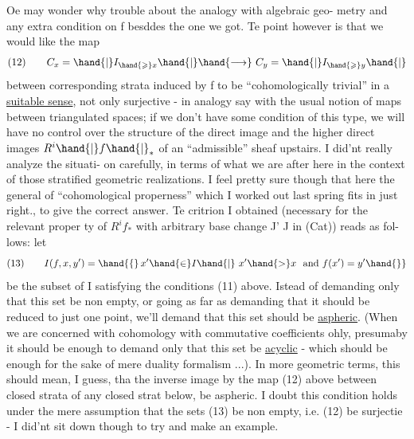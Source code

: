 Oe may wonder why trouble about the analogy with algebraic geo-%
metry and any extra condition on f besddes the one we got.  Te point
however is that we would like the map
\[ \text{(12)} \qquad C_x = \hand{|} I_{\hand{\geqslant}x} \hand{|} \hand{\longrightarrow} \ C_y = \hand{|} I_{\hand{\geqslant}y} \hand{|} \]
between corresponding strata induced by \hand{$|$}f\hand{$|$} to be ``cohomologically
trivial'' in a \uline{suitable sense},  not only surjective  -  in analogy say
with the usual notion of maps between triangulated spaces;  if we don't
have some condition of this type,  we will have no control over the
structure of the direct image and the higher direct images $R^i\hand{|}f\hand{|}_*$
of an ``admissible'' sheaf upstairs.  I did'nt really analyze the situati-%
on carefully,  in terms of what we are after here in the context of
those stratified geometric realizations.  I feel pretty sure though 
that here the general  of ``cohomological properness'' which I
worked out last spring fits in just right.,  to give the correct answer.
Te critrion I obtained (necessary  for the relevant   proper%
ty of $R^if_*$  with arbitrary base change J' \hand{$\to$} J in (Cat)) reads as fol-%
lows:  let
\[ \text{(13)} \qquad I(f,x,y') = \hand{\{}\, x'\hand{\in} I \hand{|} \ x' \hand{>} x \ \text{ and } f(x') = y' \hand{\}} \]
be the subset of I satisfying the conditions (11) above.  Istead
of demanding only that this set be non empty,  or going as far as
demanding that it should  be reduced to just one point,  we'll
demand that this set should be \uline{aspheric}.  (When we are concerned with
cohomology with commutative coefficients ohly,  presumaby it should
be enough to demand only that this set be \uline{acyclic} - which should be
enough for the sake of  mere duality formalism ...).  In more geometric
terms,  this should mean,  I guess,  tha the inverse image\hand{,} by the
\margin{$\times$}map (12) above between closed strata\hand{,} of any closed strat below,
\margin{\unsure{,}} be aspheric.  I doubt this condition holds under the  mere 
assumption that the sets (13) be non empty,  i.e. (12) be surjectie
-  I did'nt sit down though to try and make an example.


